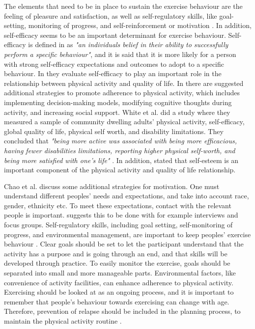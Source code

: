The elements that need to be in place to sustain the exercise behaviour are the feeling of pleasure and satisfaction, as well as self-regulatory skills, like goal-setting, monitoring of progress, and self-reinforcement or motivation \cite{schutzer}. In addition, self-efficacy seems to be an important determinant for exercise behaviour. Self-efficacy is defined in \cite{schutzer} as \emph{"an individuals belief in their ability to successfully perform a specific behaviour"}, and it is said that it is more likely for a person with strong self-efficacy expectations and outcomes to adopt to a specific behaviour. In \cite{white} they evaluate self-efficacy to play an important role in the relationship between physical activity and quality of life. In \cite{chao} there are suggested additional strategies to promote adherence to physical activity, which includes implementing decision-making models, modifying cognitive thoughts during activity, and increasing social support. White et al. did a study where they measured a sample of community dwelling adults' physical activity, self-efficacy, global quality of life, physical self worth, and disability limitations. They concluded that \emph{"being more active was associated with being more efficacious, having fewer disabilities limitations, reporting higher physical self-worth, and being more satisfied with one's life"} \cite{white}. In addition, \cite{white} stated that self-esteem is an important component of the physical activity and quality of life relationship. 

Chao et al. \cite{chao} discuss some additional strategies for motivation.  One must understand different peoples' needs and expectations, and take into account race, gender, ethnicity etc. To meet these expectations, contact with the relevant people is important. \cite{chao} suggests this to be done with for example interviews and focus groups. Self-regulatory skills, including goal setting, self-monitoring of progress, and environmental management, are important to keep peoples' exercise behaviour \cite{chao}. Clear goals should be set to let the participant understand that the activity has a purpose and is going through an end, and that skills will be developed through practice. To easily monitor the exercise, goals should be separated into small and more manageable parts. Environmental factors, like convenience of activity facilities, can enhance adherence to physical activity. Exercising should be looked at as an ongoing process, and it is important to remember that people's behaviour towards exercising can change with age. Therefore, prevention of relapse should be included in the planning process, to maintain the physical activity routine \cite{chao}. 

